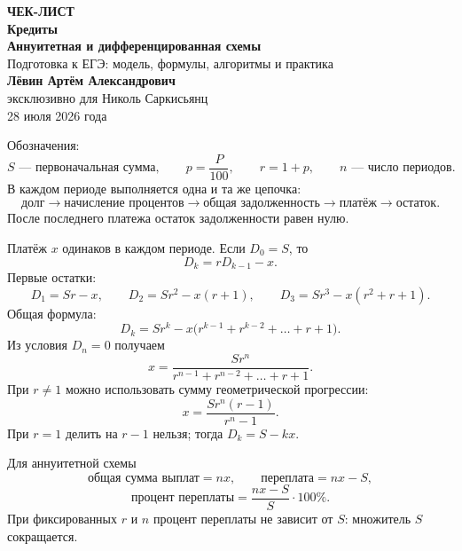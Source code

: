\documentclass[a4paper,12pt]{article}
\newcommand{\sectiontitle}[1]{\vspace{0.4em}{\Large\bfseries\textcolor{darkaccent}{#1}}\par\vspace{0.2em}{\color{accent}\rule{\linewidth}{0.7pt}}\par\vspace{0.45em}}
\begin{document}
\begin{titlepage}\thispagestyle{empty}
\begin{center}\vspace*{2.2cm}
{\Large\textcolor{accent}{\bfseries ЧЕК-ЛИСТ}}\\[0.8cm]
{\huge\bfseries\textcolor{darkaccent}{Кредиты}}\\[0.3cm]
{\LARGE\bfseries Аннуитетная и дифференцированная схемы}\\[1.5cm]
{\large Подготовка к ЕГЭ: модель, формулы, алгоритмы и практика}\\[1.8cm]
{\large\bfseries Лёвин Артём Александрович}\\[0.25cm]
{\large эксклюзивно для Николь Саркисьянц}\\[1.2cm]
{\large 28 июля 2026 года}
\vfill
{}
\end{center}\end{titlepage}

\sectiontitle{1. Универсальная модель кредита}
Обозначения:
\[
S\text{ --- первоначальная сумма},\qquad p=\frac{P}{100},\qquad r=1+p,\qquad n\text{ --- число периодов}.
\]
В каждом периоде выполняется одна и та же цепочка:
\[
\text{долг}\longrightarrow\text{начисление процентов}\longrightarrow\text{общая задолженность}\longrightarrow\text{платёж}\longrightarrow\text{остаток}.
\]
После последнего платежа остаток задолженности равен нулю.

\sectiontitle{2. Аннуитетная схема}
Платёж $x$ одинаков в каждом периоде. Если $D_0=S$, то
\[
\boxed{D_k=rD_{k-1}-x}.
\]
Первые остатки:
\[
D_1=Sr-x,\qquad D_2=Sr^2-x(r+1),\qquad D_3=Sr^3-x(r^2+r+1).
\]
Общая формула:
\[
D_k=Sr^k-x\bigl(r^{k-1}+r^{k-2}+\dots+r+1\bigr).
\]
Из условия $D_n=0$ получаем
\[
\boxed{x=\frac{Sr^n}{r^{n-1}+r^{n-2}+\dots+r+1}}.
\]
При $r\ne1$ можно использовать сумму геометрической прогрессии:
\[
x=\frac{Sr^n(r-1)}{r^n-1}.
\]
При $r=1$ делить на $r-1$ нельзя; тогда $D_k=S-kx$.

\sectiontitle{3. Выплаты и переплата}
Для аннуитетной схемы
\[
\text{общая сумма выплат}=nx,
\qquad
\text{переплата}=nx-S,
\]
\[
\boxed{\text{процент переплаты}=\frac{nx-S}{S}\cdot100\%}.
\]
При фиксированных $r$ и $n$ процент переплаты не зависит от $S$: множитель $S$ сокращается.
\end{document}
